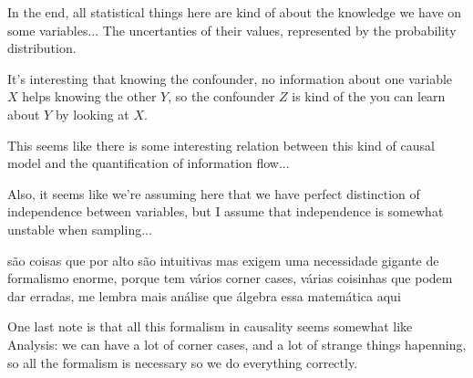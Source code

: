 In the end, all statistical things here are kind of about the knowledge we have on some variables... The uncertanties of their values, represented by the probability distribution.

It's interesting that knowing the confounder, no information about one variable $X$ helps knowing the other $Y$, so the confounder $Z$ is kind of the  you can learn about $Y$ by looking at $X$.

This seems like there is some interesting relation between this kind of causal model and the quantification of information flow...

Also, it seems like we're assuming here that we have perfect distinction of independence between variables, but I assume that independence is somewhat unstable when sampling...


são coisas que por alto são intuitivas mas exigem uma necessidade gigante de formalismo enorme, porque tem vários corner cases, várias coisinhas que podem dar erradas, me lembra mais análise que álgebra essa matemática aqui

One last note is that all this formalism in causality seems somewhat like Analysis: we can have a lot of corner cases, and a lot of strange things hapenning, so all the formalism is necessary so we do everything correctly.
